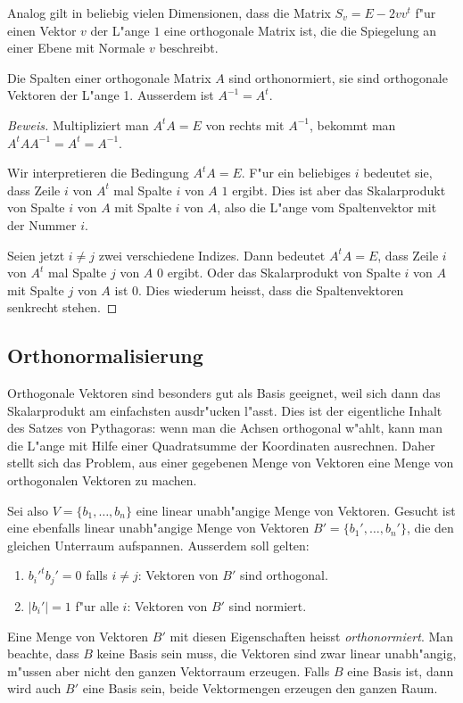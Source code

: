 \begin{beispiel}
Analog gilt in beliebig vielen Dimensionen, dass die Matrix
$S_v=E-2v v^t$  f"ur einen Vektor $v$ der L"ange $1$ eine orthogonale
Matrix ist, die die Spiegelung an einer Ebene mit Normale $v$
beschreibt.
\end{beispiel}

\begin{satz}
Die Spalten einer orthogonale Matrix $A$ sind orthonormiert, sie sind
orthogonale Vektoren der L"ange 1. Ausserdem ist $A^{-1}=A^t$.
\end{satz}

\begin{proof}[Beweis]
Multipliziert man $A^tA=E$ von rechts mit $A^{-1}$, bekommt man
$A^tAA^{-1}=A^t=A^{-1}$.

Wir interpretieren die Bedingung $A^tA=E$. F"ur ein beliebiges $i$
bedeutet sie, dass Zeile $i$ von $A^t$ mal Spalte $i$ von $A$ $1$ ergibt.
Dies ist aber das Skalarprodukt von Spalte $i$ von $A$ mit Spalte $i$
von $A$, also die L"ange vom Spaltenvektor mit der Nummer $i$.

Seien jetzt $i\ne j$ zwei verschiedene Indizes. Dann bedeutet $A^tA=E$,
dass Zeile $i$ von $A^t$ mal Spalte $j$ von $A$ $0$ ergibt. Oder das
Skalarprodukt von Spalte $i$ von $A$ mit Spalte $j$ von $A$ ist $0$.
Dies wiederum heisst, dass die Spaltenvektoren senkrecht stehen.
\end{proof}

\subsection{Orthonormalisierung}
Orthogonale Vektoren sind besonders gut als Basis geeignet, weil
sich dann das Skalarprodukt am einfachsten ausdr"ucken l"asst.
Dies ist der eigentliche Inhalt des Satzes von Pythagoras: wenn
man die Achsen orthogonal w"ahlt, kann man die L"ange mit Hilfe
einer Quadratsumme der Koordinaten ausrechnen. Daher stellt sich 
das Problem, aus einer gegebenen Menge von Vektoren eine Menge
von orthogonalen Vektoren zu machen.

Sei also $V=\{b_1,\dots,b_n\}$ eine linear unabh"angige Menge von
Vektoren. Gesucht ist eine ebenfalls linear unabh"angige Menge 
von Vektoren $B'=\{b_1',\dots,b_n'\}$, die den gleichen Unterraum
aufspannen.
Ausserdem soll gelten:
\begin{enumerate}
\item $b_i'^tb_j'=0$ falls $i\ne j$: Vektoren von $B'$ sind orthogonal.
\item $|b_i'|=1$ f"ur alle $i$: Vektoren von $B'$ sind normiert.
\end{enumerate}
Eine Menge von Vektoren $B'$ mit diesen Eigenschaften heisst
{\it orthonormiert}.
Man beachte, dass $B$ keine Basis sein muss, die Vektoren sind zwar
linear unabh"angig, m"ussen aber nicht den ganzen Vektorraum erzeugen. 
Falls $B$ eine Basis ist, dann wird auch $B'$ eine Basis sein, beide
Vektormengen erzeugen den ganzen Raum.

